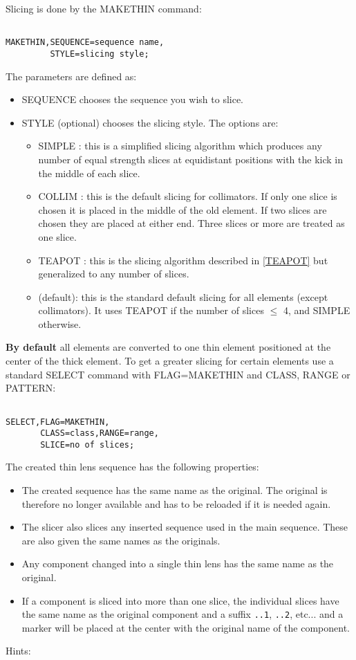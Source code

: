  Slicing is done by the MAKETHIN command: 
\begin{verbatim}

MAKETHIN,SEQUENCE=sequence name,
         STYLE=slicing style;
\end{verbatim} The parameters are defined as: 
\begin{itemize}
	\item SEQUENCE chooses the sequence you wish to slice. 
	\item STYLE (optional) chooses the slicing style. The options are:   
\begin{itemize}
	\item SIMPLE : this is a simplified slicing algorithm which produces any number of equal strength slices at equidistant positions with the kick in the middle of each slice.     
	\item COLLIM : this is the default slicing for collimators. If only one slice is  chosen it is placed in the middle of the old element. If two slices are chosen they  are placed at either end. Three slices or more are treated as one slice.     
	\item TEAPOT : this is the slicing algorithm described in \href{../Introduction/bibliography.html#TEAPOT}{[TEAPOT]} but generalized to any number of slices.     
	\item      (default): this is the standard default slicing for all elements (except collimators). It uses TEAPOT if the number of slices $\leq$ 4, and SIMPLE otherwise.    
\end{itemize}
\end{itemize}
\textbf{By default} all elements are converted to one thin element positioned at the center of  the thick element. To get a greater slicing for certain elements use a standard SELECT command with FLAG=MAKETHIN and  CLASS, RANGE or PATTERN: 
\begin{verbatim}

SELECT,FLAG=MAKETHIN,
       CLASS=class,RANGE=range,
       SLICE=no of slices;
\end{verbatim}  The created thin lens sequence has the following properties: 
\begin{itemize}
	\item The created sequence has the same name as the original. The original is therefore no longer  available and has to be reloaded if it is needed again.  
	\item The slicer also slices any inserted sequence used in the main sequence. These are also given the same names as the originals. 
	\item Any component changed into a single thin lens has the same name as the original. 
	\item If a component is sliced into more than one slice, the individual slices have the same name as the original component and a suffix \texttt{..1}, \texttt{..2}, etc... and a marker  will be placed at the center with the original name of the component. 
\end{itemize}  Hints: 
